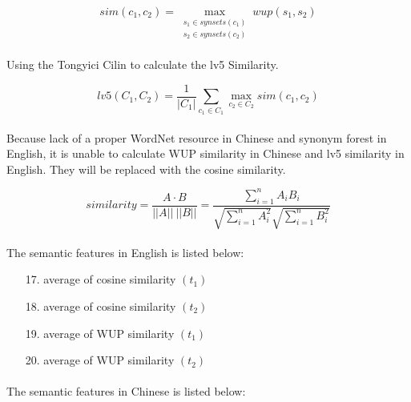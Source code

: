 \documentclass[12pt]{article}
\begin{document}
\begin{CJK*}{UTF8}{bkai}
\begin{spacing}{1.77}
\begin{equation}
  sim(c_1,c_2)=\max\limits_{\substack{s_1\in synsets(c_1) \\ s_2\in synsets(c_2)}} wup(s_1,s_2)
\end{equation}

\paragraph{}
Using the Tongyici Cilin to calculate the lv5 Similarity.

\begin{equation}
  lv5(C_1,C_2)=\frac{1}{|C_1|}\sum\limits_{c_1\in C_1}\max\limits_{c_2\in C_2} sim(c_1,c_2)
\end{equation}

\paragraph{}
Because lack of a proper WordNet resource in Chinese and synonym forest in English, it is unable to calculate WUP similarity in Chinese and lv5 similarity in English. They will be replaced with the cosine similarity.

\begin{equation}
  similarity=\frac{A\cdot B}{||A||\ ||B||}=\frac{\sum\limits^{n}_{i=1}A_iB_i}{\sqrt{\sum\limits^{n}_{i=1}A^2_i}\sqrt{\sum\limits^{n}_{i=1}B^2_i}}
\end{equation}

\paragraph{}
The semantic features in English is listed below:

\begin{enumerate}
  \item[17.] average of cosine similarity $(t_1)$
  \item[18.] average of cosine similarity $(t_2)$
  \item[19.] average of WUP similarity $(t_1)$
  \item[20.] average of WUP similarity $(t_2)$
\end{enumerate}

\paragraph{}
The semantic features in Chinese is listed below:


\end{spacing}
\end{CJK*}
\end{document}
